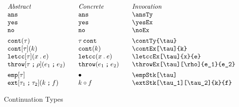 \documentclass[11pt]{article}
\begin{document}
\begin{figure}

  \begin{small}
    \begin{displaymath}
      \begin{array}{l@{\qquad}l@{\qquad}l@{\qquad}l}
        \textit{Abstract} & \textit{Concrete} & \textit{Invocation} \\
        \ansTy                         & \ansTy*             & \verb|\ansTy|                         \\
        \yesEx                         & \yesEx*             & \verb|\yesEx|                         \\
        \noEx                          & \noEx*              & \verb|\noEx|                          \\[1ex]

        \contTy{\tau}                  & \contTy*{\tau}      & \verb|\contTy{\tau}|                  \\
        \contEx[\tau]{k}                     & \contEx*{k}         & \verb|\contEx[\tau]{k} |                    \\
        \letccEx[\tau]{x}{e}           & \letccEx*{x}{e}     & \verb|\letccEx[\tau]{x}{e}|           \\
        \throwEx[\tau][\rho]{e_1}{e_2} & \throwEx*{e_1}{e_2} & \verb|\throwEx[\tau][\rho]{e_1}{e_2}| \\[1ex]

        \empStk[\tau]                  & \empStk*[\tau]      & \verb|\empStk[\tau]|                  \\
        \extStk[\tau_1][\tau_2]{k}{f}  & \extStk*{k}{f}      & \verb|\extStk[\tau_1][\tau_2]{k}{f}|
      \end{array}
    \end{displaymath}
  \end{small}

  \caption{Continuation Types}
  \label{fig:cont}
\end{figure}
\end{document}
